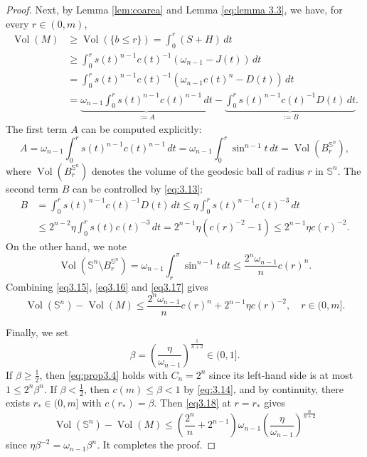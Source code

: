 \documentclass[11pt]{amsart}
\theoremstyle{plain}
\numberwithin{equation}{section}
\renewcommand{\S}{\mathbb{S}}
\DeclareMathOperator{\vol}{Vol}
\newcommand{\bsls}{\{b\le r\}}
\begin{document}
\begin{proof}
Next, by Lemma \ref{lem:coarea} and Lemma \ref{eq:lemma 3.3}, we have, for every $r\in(0,m)$,
\begin{align*}
\vol(M)&\ge\vol(\bsls)=\int_0^r(S+H)\,dt\\
&\ge\int_0^rs(t)^{n-1}c(t)^{-1}(\omega_{n-1}-J(t))\,dt\\
&=\int_0^rs(t)^{n-1}c(t)^{-1}(\omega_{n-1}c(t)^n-D(t))\,dt\\
&=\underbrace{\omega_{n-1}\int_0^rs(t)^{n-1}c(t)^{n-1}\,dt}_{:=A}-\underbrace{\int_0^rs(t)^{n-1}c(t)^{-1}D(t)\,dt}_{:=B}.
\end{align*}
The first term $A$ can be computed explicitly:
\begin{equation}\label{eq3.15}
A=\omega_{n-1}\int_0^rs(t)^{n-1}c(t)^{n-1}\,dt=\omega_{n-1}\int_0^r\sin^{n-1}t\,dt=\vol\left(B_r^{\S^n}\right),
\end{equation}
where $\vol\left(B_r^{\S^n}\right)$ denotes the volume of the geodesic ball of radius $r$ in $\S^n$. The second term $B$ can be controlled by \eqref{eq:3.13}: 
\begin{equation}\label{eq3.16}
\begin{aligned}
B&=\int_0^rs(t)^{n-1}c(t)^{-1}D(t)\,dt\le \eta\int_0^rs(t)^{n-1}c(t)^{-3}\,dt\\
&\le 2^{n-2}\eta\int_0^rs(t)c(t)^{-3}\,dt=2^{n-1}\eta (c(r)^{-2}-1)\le 2^{n-1}\eta c(r)^{-2}.
\end{aligned}
\end{equation}
On the other hand, we note 
\begin{equation}\label{eq3.17}
\vol\left(\S^n\setminus B_r^{\S^n}\right)=\omega_{n-1}\int_r^{\pi}\sin^{n-1}t\,dt\le\frac{2^{n}\omega_{n-1}}{n}c(r)^n.
\end{equation}
Combining \eqref{eq3.15}, \eqref{eq3.16} and \eqref{eq3.17} gives 
\begin{equation}\label{eq3.18}
\vol(\S^n)-\vol(M)\le \frac{2^n\omega_{n-1}}{n}c(r)^n+2^{n-1}\eta c(r)^{-2},\quad r\in(0,m].
\end{equation}

Finally, we set
\begin{equation*}
    \beta=\left(\frac{\eta}{\omega_{n-1}}\right)^{\frac{1}{n+2}}\in(0,1].
\end{equation*}
If $\beta\ge\frac{1}{2}$, then \eqref{eq:prop3.4} holds with $C_n=2^n$ since its left-hand side is at most $1\le 2^n\beta^n$. If $\beta<\frac{1}{2}$, then $c(m)\le \beta<1$ by \eqref{eq:3.14}, and by continuity, there exists $r_\ast\in(0,m]$ with $c(r_\ast)=\beta$. Then \eqref{eq3.18} at $r=r_\ast$ gives 
\begin{equation*}
\vol(\S^n)-\vol(M)\le\left(\frac{2^n}{n}+2^{n-1}\right)\omega_{n-1}\left(\frac{\eta}{\omega_{n-1}}\right)^{\frac{n}{n+2}}
\end{equation*}
since $\eta\beta^{-2}=\omega_{n-1}\beta^n$. It completes the proof.
\end{proof}
\end{document}
